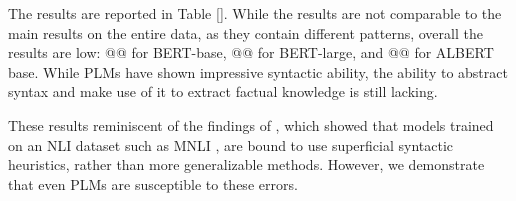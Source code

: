 The results are reported in Table \ref{}.  While the results are not comparable to the main results on the entire data, as they contain different patterns, overall the results are low: @@ for BERT-base, @@ for BERT-large, and @@ for ALBERT base. 
While PLMs have shown impressive syntactic ability, the ability to abstract syntax and make use of it to extract factual knowledge is still lacking.

These results reminiscent of the findings of \citet{mccoy2019right}, which showed that models trained on an NLI dataset \cite{dagan-rte,snli} such as MNLI \cite{mnli}, are bound to use superficial syntactic heuristics, rather than more generalizable methods.
However, we demonstrate that even PLMs are susceptible to these errors. 